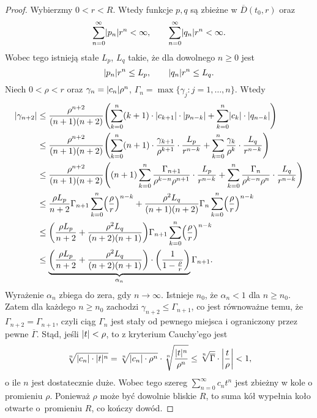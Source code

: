 \begin{proof}
  Wybierzmy $0 < r < R$. Wtedy funkcje $p,q$ są zbieżne w $\overline{D} (t_0,r)$ oraz
  \begin{equation*}
    \sum_{n=0}^{\infty} \abs{p_n} r^n < \infty, \qquad \sum_{n=0}^{\infty} \abs{q_n} r^n < \infty.
  \end{equation*}
  Wobec tego istnieją stałe $L_p$, $L_q$ takie, że dla dowolnego $n \geq 0$ jest
  \begin{equation*}
    \abs{p_n} r^n \leq L_p, \qquad \abs{q_n} r^n \leq L_q.
  \end{equation*}
  Niech $0 < \rho < r$ oraz $\gamma_n = \abs{c_n} \rho^n$, $\Gamma_n = \max\{\gamma_j: j = 1,\ldots,n\}$. Wtedy
  \begin{align*}
    \abs{\gamma_{n+2}}
    &\leq \frac{\rho^{n+2}}{(n+1)(n+2)} \p*{ \sum_{k = 0}^{n} (k + 1) \cdot \abs{c_{k + 1}} \cdot \abs{p_{n - k}} + 
        \sum_{k = 0}^{n} \abs{c_k} \cdot \abs{q_{n - k}}} \\ 
    &\leq \frac{\rho^{n+2}}{(n+1)(n+2)} \p*{ \sum_{k=0}^{n} (n+1) \cdot \frac{\gamma_{k+1}}{\rho^{k+1}} 
        \cdot \frac{L_p}{r^{n-k}} + \sum_{k=0}^{n} \frac{\gamma_k}{\rho^k} \cdot \frac{L_q}{r^{n-k}} } \\ 
    &\leq \frac{\rho^{n+2}}{(n+1)(n+2)} \p*{ (n+1) \sum_{k=0}^{n} \frac{\Gamma_{n+1}}{\rho^{k-n} \rho^{n+1}} \cdot 
        \frac{L_p}{r^{n-k}} + \sum_{k=0}^{n} \frac{\Gamma_n}{\rho^{k-n}\rho^{n}} \cdot \frac{L_q}{r^{n-k}} } \\
    &\leq \frac{\rho L_p}{n+2} \Gamma_{n+1} \sum_{k=0}^{n} \p*{ \frac{\rho}{r} }^{n-k} +
        \frac{\rho^2 L_q}{(n+1)(n+2)} \Gamma_n \sum_{k=0}^{n} \p*{ \frac{\rho}{r} }^{n-k} \\
    &\leq \p*{ \frac{\rho L_p}{n+2} + \frac{\rho^2 L_q}{(n+2)(n+1)}} \Gamma_{n+1}
        \sum_{k=0}^n \p*{ \frac{\rho}{r} }^{n-k} \\
    &\leq \underbrace{\p*{ \frac{\rho L_p}{n+2} + \frac{\rho^2 L_q}{(n+2)(n+1)}} \cdot
        \p*{\frac{1}{1 - \frac{\rho}{r}}}}_{\alpha_n} \Gamma_{n+1}.
  \end{align*}
  Wyrażenie $\alpha_n$ zbiega do zera, gdy $n \to \infty$. Istnieje $n_0$, że $\alpha_n < 1$ dla $n \geq n_0$. Zatem 
  dla każdego $n \geq n_0$ zachodzi $\gamma_{n+2} \leq \Gamma_{n+1}$, co jest równoważne temu, że
  $\Gamma_{n+2} = \Gamma_{n+1}$, czyli ciąg $\Gamma_n$ jest stały od pewnego miejsca i ograniczony przez pewne 
  $\overline{\Gamma}$. Stąd, jeśli $\abs{t} < \rho$, to z kryterium Cauchy'ego jest
  \begin{equation*}
    \sqrt[n]{\abs{c_n} \cdot \abs{t}^n} = \sqrt[n]{\abs{c_n} \cdot \rho^n} \cdot 
    \sqrt[n]{\frac{\abs{t}^n}{\rho^n}} \leq \sqrt[n]{\overline{\Gamma}} \cdot \abs*{\frac{t}{\rho}} < 1,
  \end{equation*}
  o ile $n$ jest dostatecznie duże.
  Wobec tego szereg $\sum_{n=0}^{\infty} c_n t^n$ jest zbieżny w kole o promieniu $\rho$. Ponieważ $\rho$ może być 
  dowolnie bliskie $R$, to suma kół wypełnia koło otwarte o~promieniu $R$, co kończy dowód.
\end{proof}
